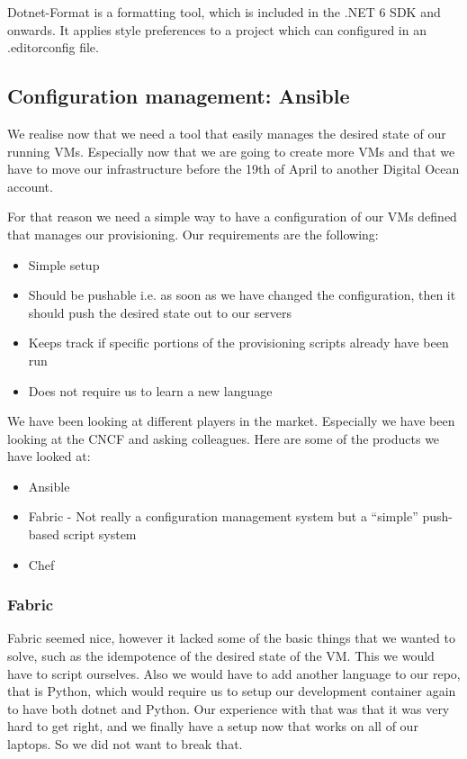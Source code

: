 Dotnet-Format is a formatting tool, which is included in the .NET 6 SDK and onwards. It applies style preferences to a project which can configured in an .editorconfig file.

\subsection{Configuration management: Ansible}

We realise now that we need a tool that easily manages the desired state of our running VMs. Especially now that we are going to create more VMs and that we have to move our infrastructure before the 19th of April to another Digital Ocean account.

For that reason we need a simple way to have a configuration of our VMs defined that manages our provisioning. Our requirements are the following:

\begin{itemize}
    \item Simple setup
    \item Should be pushable i.e. as soon as we have changed the configuration, then it should push the desired state out to our servers
    \item Keeps track if specific portions of the provisioning scripts already have been run
    \item Does not require us to learn a new language
\end{itemize}

We have been looking at different players in the market. Especially we have been looking at the CNCF and asking colleagues. Here are some of the products we have looked at:

\begin{itemize}
    \item Ansible
    \item Fabric - Not really a configuration management system but a “simple” push-based script system
    \item Chef
\end{itemize}

\subsubsection{Fabric}

Fabric seemed nice, however it lacked some of the basic things that we wanted to solve, such as the idempotence of the desired state of the VM. This we would have to script ourselves. Also we would have to add another language to our repo, that is Python, which would require us to setup our development container again to have both dotnet and Python. Our experience with that was that it was very hard to get right, and we finally have a setup now that works on all of our laptops. So we did not want to break that.

